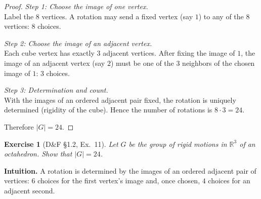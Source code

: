 \documentclass[12pt]{article}
\newtheorem{exercise}[theorem]{Exercise}
\theoremstyle{definition}
\begin{document}
\begin{proof}
\noindent\emph{Step 1: Choose the image of one vertex.}\\

\noindent
Label the $8$ vertices. A rotation may send a fixed vertex (say $1$) to any of the $8$ vertices: $8$ choices.

\dotfill

\noindent\emph{Step 2: Choose the image of an adjacent vertex.}\\

\noindent
Each cube vertex has exactly $3$ adjacent vertices. After fixing the image of $1$, the image of an adjacent
vertex (say $2$) must be one of the $3$ neighbors of the chosen image of $1$: $3$ choices.

\dotfill

\noindent\emph{Step 3: Determination and count.}\\

\noindent
With the images of an ordered adjacent pair fixed, the rotation is uniquely determined (rigidity of the cube).
Hence the number of rotations is $8\cdot 3=24$.

\dotfill

Therefore $\lvert G\rvert=24$.
\end{proof}

\newpage

\begin{exercise}[D\&F §1.2, Ex.~11]
Let $G$ be the group of rigid motions in $\mathbb{R}^3$ of an octahedron. Show that $\lvert G\rvert=24$.
\end{exercise}

\dotfill

\noindent
\textbf{Intuition.}
A rotation is determined by the images of an ordered adjacent pair of vertices:
$6$ choices for the first vertex’s image and, once chosen, $4$ choices for an adjacent second.

\dotfill
\end{document}
